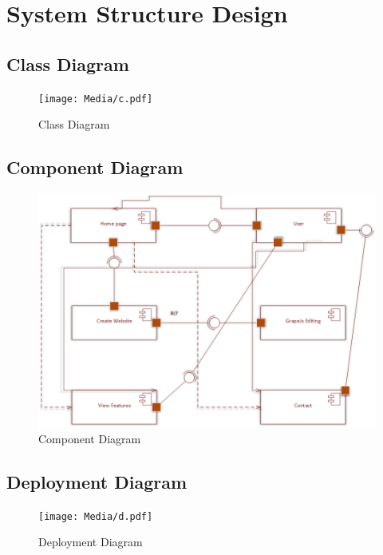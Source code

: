 \documentclass[12pt]{report}
\begin{document}
\clearpage

\section{System Structure Design}
\subsection{Class Diagram}

\begin{figure}[ht]
    \centering
    \texttt{[image: Media/c.pdf]} %
    \caption{Class Diagram}
    \label{fig:drawing1}
\end{figure}
\clearpage
\subsection{Component Diagram}    %

\begin{figure}[ht]
    \centering
    \includegraphics[width=1\textwidth]{Media/com.jpg} %
    \caption{Component Diagram}
    \label{fig:drawing1}
\end{figure}
\clearpage   %
\subsection{Deployment Diagram}

\begin{figure}[ht]
    \centering
    \texttt{[image: Media/d.pdf]} %
    \caption{Deployment Diagram}
    \label{fig:drawing1}
\end{figure}
\clearpage
\end{document}
